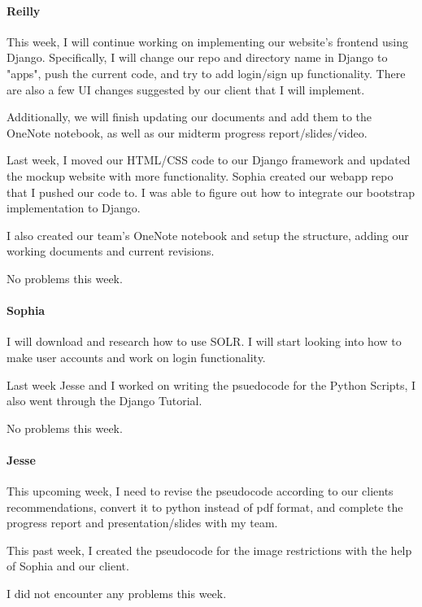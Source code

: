 \documentclass[onecolumn, draftclsnofoot,10pt, compsoc]{IEEEtran}
\begin{document}
\begin{flushleft}
\paragraph{Reilly}
 
This week, I will continue working on implementing our website's frontend using Django. Specifically, I will change our repo and directory name in Django to "apps", push the current code, and try to add login/sign up functionality. There are also a few UI changes suggested by our client that I will implement.
 
Additionally, we will finish updating our documents and add them to the OneNote notebook, as well as our midterm progress report/slides/video.
 
 
Last week, I moved our HTML/CSS code to our Django framework and updated the mockup website with more functionality. Sophia created our webapp repo that I pushed our code to. I was able to figure out how to integrate our bootstrap implementation to Django.
 
I also created our team's OneNote notebook and setup the structure, adding our working documents and current revisions.
 
 
No problems this week.
 
\paragraph{Sophia}
 
I will download and research how to use SOLR. I will start looking into how to make user accounts and work on login functionality.
 
 
Last week Jesse and I worked on writing the psuedocode for the Python Scripts, I also went through the Django Tutorial.
 
 
No problems this week.
 
\paragraph{Jesse}
 
This upcoming week, I need to revise the pseudocode according to our clients recommendations, convert it to python instead of pdf format, and complete the progress report and presentation/slides with my team.
 
 
This past week, I created the pseudocode for the image restrictions with the help of Sophia and our client.
 
 
I did not encounter any problems this week.
 

\end{flushleft}
\end{document}
